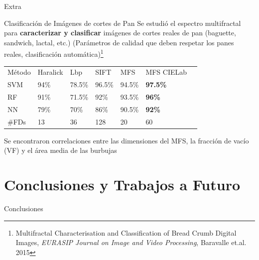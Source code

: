 \documentclass[spanish,unknownkeysallowed,10pt]{beamer}
\begin{document}
\begin{frame}
\begin{block}{}
\begin{center}
\vspace{1cm}
\huge{Extra}
\vspace{1cm}
\end{center}
\end{block}
\end{frame}

\begin{frame}{Clasificación de Imágenes de cortes de Pan}
Se estudió el espectro multifractal para \textbf{caracterizar y clasificar} imágenes de cortes reales de pan (baguette, sandwich, lactal, etc.) (Parámetros de calidad que deben respetar los panes reales, clasificación automática)\footnote{Multifractal Characterisation and Classification of Bread Crumb Digital Images, {\it EURASIP Journal on Image and Video Processing}, Baravalle et.al. 2015}

\begin{table}[h!]
\center
\begin{tabular}{lllllll}
\hline\noalign{\smallskip}
Método & Haralick & Lbp & SIFT & MFS & MFS CIELab\\
\noalign{\smallskip}\hline\noalign{\smallskip}
SVM & 94\% & 78.5\% & 96.5\% & 94.5\% & \textbf{97.5\%} \\
RF  & 91\% & 71.5\% & 92\% & 93.5\% & \textbf{96\%} \\
NN & 79\% & 70\% & 86\%  & 90.5\% & \textbf{92\%} \\
\noalign{\smallskip}\hline
\#FDs & 13 & 36 & 128 & 20 & 60\\
\hline
\end{tabular}
\label{tab:other} 
\end{table}

Se encontraron correlaciones entre las dimensiones del MFS, la fracción de vacío (VF) y el área media de las burbujas


\end{frame}

\section[Conclusiones]{Conclusiones y Trabajos a Futuro}


\begin{frame}
\begin{block}{}
\begin{center}
\vspace{1cm}
\huge{Conclusiones}
\vspace{1cm}
\end{center}
\end{block}
\end{frame}
\end{document}
